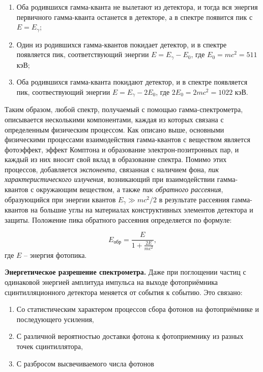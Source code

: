     \begin{enumerate}
        \item Оба родившихся гамма-кванта не вылетают из детектора, и тогда вся энергия первичного гамма-кванта останется в детекторе, а в спектре появится пик с $E=E_{\gamma}$;
        \item Один из родившихся гамма-квантов покидает детектор, и в спектре появляется пик, соответствующий энергии $E=E_{\gamma} - E_0$, где $E_0 = mc^2=511$ кэВ;
        \item Оба родившихся гамма-кванта покидают детектор, и в спектре появляется пик, соотвествующий энергии $E = E_{\gamma} - 2E_0$, где $2E_0 = 2mc^2= 1022$ кэВ.
    \end{enumerate}

    Таким образом, любой спектр, получаемый с помощью гамма-спектрометра, описывается несколькими компонентами, каждая из которых связана с определенным физическим процессом. Как описано выше, основными физическими процессами взаимодействия гамма-квантов с веществом является фотоэффект, эффект Комптона и образование электрон-позитронных пар, и каждый из них вносит свой вклад в образование спектра. Помимо этих процессов, добавляется \textit{экспонента}, связанная с наличием фона, \textit{пик характеристического излучения}, возникающий при взаимодействии гамма-квантов с окружающим веществом, а также \textit{пик обратного рассеяния}, образующийся при энергии квантов $E_{\gamma}\gg mc^2/2$ в результате рассеяния гамма-квантов на большие углы на материалах  конструктивных элементов детектора и защиты. Положение пика обратного рассеяния определяется по формуле:

    \begin{equation}
        E_{\text{обр}} = \frac{E}{1 + \frac{2E}{mc^2}},
        \label{eq:Ereverse}
    \end{equation}
    где $E$ -- энергия фотопика.

    \textbf{Энергетическое разрешение спектрометра.} Даже при поглощении частиц с одинаковой энергией амплитуда импульса на выходе фотоприёмника сцинтилляционного детектора меняется от события к событию. Это связано:
    \begin{enumerate}
        \item Со статистическим характером процессов сбора фотонов на фотоприёмнике и последующего усиления,
        \item С различной вероятностью доставки фотона к фотоприемнику из разных точек сцинтиллятора,
        \item С разбросом высвечиваемого числа фотонов
    \end{enumerate}

